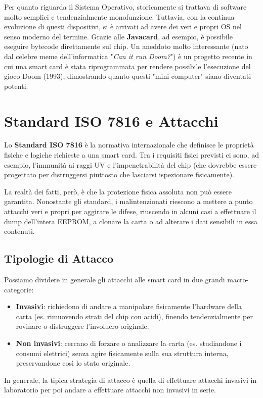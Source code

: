 Per quanto riguarda il Sistema Operativo, storicamente si trattava di software molto semplici e tendenzialmente monofunzione. Tuttavia, con la continua evoluzione di questi dispositivi, si è arrivati ad avere dei veri e propri OS nel senso moderno del termine. Grazie alle \textbf{Javacard}, ad esempio, è possibile eseguire bytecode direttamente sul chip. Un aneddoto molto interessante (nato dal celebre meme dell'informatica "\textit{Can it run Doom?}") è un progetto recente in cui una smart card è stata riprogrammata per rendere possibile l'esecuzione del gioco Doom (1993), dimostrando quanto questi "mini-computer" siano diventati potenti.

\section{Standard ISO 7816 e Attacchi}
Lo \textbf{Standard ISO 7816} è la normativa internazionale che definisce le proprietà fisiche e logiche richieste a una smart card. Tra i requisiti fisici previsti ci sono, ad esempio, l'immunità ai raggi UV e l'impenetrabilità del chip (che dovrebbe essere progettato per distruggersi piuttosto che lasciarsi ispezionare fisicamente).

La realtà dei fatti, però, è che la protezione fisica assoluta non può essere garantita. Nonostante gli standard, i malintenzionati riescono a mettere a punto attacchi veri e propri per aggirare le difese, riuscendo in alcuni casi a effettuare il dump dell'intera EEPROM, a clonare la carta o ad alterare i dati sensibili in essa contenuti.

\subsection{Tipologie di Attacco}
Possiamo dividere in generale gli attacchi alle smart card in due grandi macro-categorie:
\begin{itemize}
    \item \textbf{Invasivi}: richiedono di andare a manipolare fisicamente l'hardware della carta (es. rimuovendo strati del chip con acidi), finendo tendenzialmente per rovinare o distruggere l'involucro originale.
    \item \textbf{Non invasivi}: cercano di forzare o analizzare la carta (es. studiandone i consumi elettrici) senza agire fisicamente sulla sua struttura interna, preservandone così lo stato originale.
\end{itemize}
In generale, la tipica strategia di attacco è quella di effettuare attacchi invasivi in laboratorio per poi andare a effettuare attacchi non invasivi in serie.

